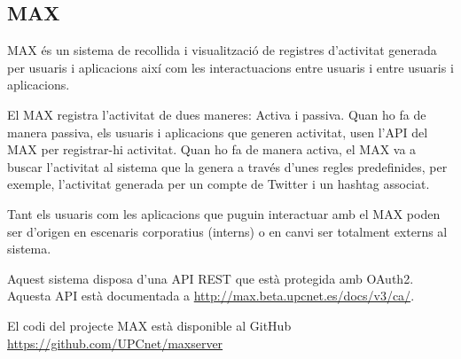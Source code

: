 \subsection{MAX}
\label{sec:max}

MAX és un sistema de recollida i visualització de registres d’activitat generada per usuaris i aplicacions així com les interactuacions entre usuaris i entre usuaris i aplicacions.

El MAX registra l’activitat de dues maneres: Activa i passiva. Quan ho fa de manera passiva, els usuaris i aplicacions que generen activitat, usen l’API del MAX per registrar-hi activitat. Quan ho fa de manera activa, el MAX va a buscar l’activitat al sistema que la genera a través d’unes regles predefinides, per exemple, l’activitat generada per un compte de Twitter i un hashtag associat.

Tant els usuaris com les aplicacions que puguin interactuar amb el MAX poden ser d’origen en escenaris corporatius (interns) o en canvi ser totalment externs al sistema.

Aquest sistema disposa d'una API REST que està protegida amb OAuth2. Aquesta API està documentada a \url{http://max.beta.upcnet.es/docs/v3/ca/}.

El codi del projecte MAX està disponible al GitHub \url{https://github.com/UPCnet/maxserver}